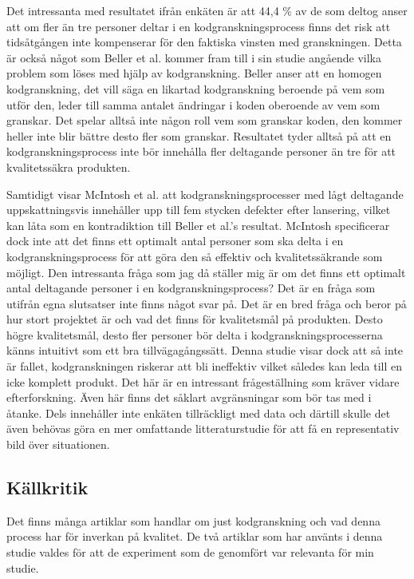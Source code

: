 Det intressanta med resultatet ifrån enkäten är att 44,4 \% av de som deltog anser att om fler än tre personer deltar i en kodgranskningsprocess finns det risk att tidsåtgången inte kompenserar för den faktiska vinsten med granskningen. Detta är också något som Beller et al. \cite{beller2014modern} kommer fram till i sin studie angående vilka problem som löses med hjälp av kodgranskning. Beller anser att en homogen kodgranskning, det vill säga en likartad kodgranskning beroende på vem som utför den, leder till samma antalet ändringar i koden oberoende av vem som granskar. Det spelar alltså inte någon roll vem som granskar koden, den kommer heller inte blir bättre desto fler som granskar. Resultatet tyder alltså på att en kodgranskningsprocess inte bör innehålla fler deltagande personer än tre för att kvalitetssäkra produkten. 

Samtidigt visar McIntosh et al. \cite{mcintosh2014impact} att kodgranskningsprocesser med lågt deltagande uppskattningsvis innehåller upp till fem stycken defekter efter lansering, vilket kan låta som en kontradiktion till Beller et al.'s \cite{beller2014modern} resultat. McIntosh specificerar dock inte att det finns ett optimalt antal personer som ska delta i en kodgranskningsprocess för att göra den så effektiv och kvalitetssäkrande som möjligt. Den intressanta fråga som jag då ställer mig är om det finns ett optimalt antal deltagande personer i en kodgranskningsprocess? Det är en fråga som utifrån egna slutsatser inte finns något svar på. Det är en bred fråga och beror på hur stort projektet är och vad det finns för kvalitetsmål på produkten. Desto högre kvalitetsmål, desto fler personer bör delta i kodgranskningsprocesserna känns intuitivt som ett bra tillvägagångssätt. Denna studie visar dock att så inte är fallet, kodgranskningen riskerar att bli ineffektiv vilket således kan leda till en icke komplett produkt. Det här är en intressant frågeställning som kräver vidare efterforskning. Även här finns det såklart avgränsningar som bör tas med i åtanke. Dels innehåller inte enkäten tillräckligt med data och därtill skulle det även behövas göra en mer omfattande litteraturstudie för att få en representativ bild över situationen.

\subsection{Källkritik}
Det finns många artiklar som handlar om just kodgranskning och vad denna process har för inverkan på kvalitet. De två artiklar som har använts i denna studie valdes för att de experiment som de genomfört var relevanta för min studie. 

